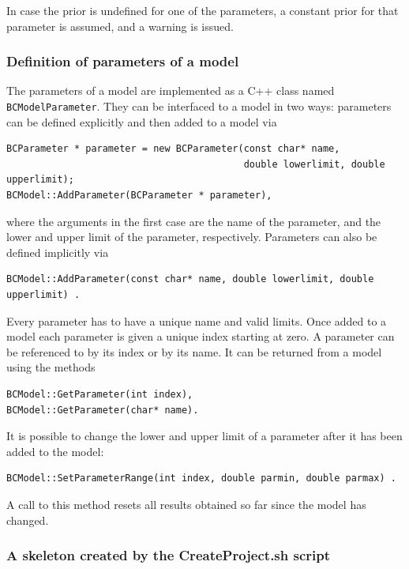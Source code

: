 \documentclass[11pt, a4paper]{article}
\begin{document}
\noindent
In case the prior is undefined for one of the parameters, a constant
prior for that parameter is assumed, and a warning is issued.


\subsubsection{Definition of parameters of a model}
\label{subsubsection:parameters}

The parameters of a model are implemented as a C++ class named
\verb|BCModelParameter|. They can be interfaced to a model in two
ways: parameters can be defined explicitly and then added to a model
via
%
\begin{verbatim}
BCParameter * parameter = new BCParameter(const char* name,
                                          double lowerlimit, double upperlimit);
BCModel::AddParameter(BCParameter * parameter),
\end{verbatim}

\noindent
where the arguments in the first case are the name of the parameter,
and the lower and upper limit of the parameter,
respectively. Parameters can also be defined implicitly via
%
\begin{verbatim}
BCModel::AddParameter(const char* name, double lowerlimit, double upperlimit) .
\end{verbatim}

\noindent
Every parameter has to have a unique name and valid limits. Once added
to a model each parameter is given a unique index starting at zero. A
parameter can be referenced to by its index or by its name. It can be
returned from a model using the methods
%
\begin{verbatim}
BCModel::GetParameter(int index),
BCModel::GetParameter(char* name).
\end{verbatim}

\noindent
It is possible to change the lower and upper limit of a parameter
after it has been added to the model:
%
\begin{verbatim}
BCModel::SetParameterRange(int index, double parmin, double parmax) .
\end{verbatim}
%
A call to this method resets all results obtained so far since the
model has changed.


\subsubsection{A skeleton created by the CreateProject.sh script}
\label{subsubsection:createproject}
\end{document}
